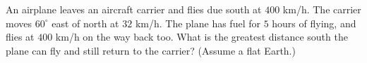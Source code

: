 An airplane leaves an aircraft carrier and flies due south at $400$ km/h. The carrier moves $60^\circ$ east of north at $32$ km/h. The plane has fuel for $5$ hours of flying, and flies at $400$ km/h on the way back too. What is the greatest distance south the plane can fly and still return to the carrier? (Assume a flat Earth.)
